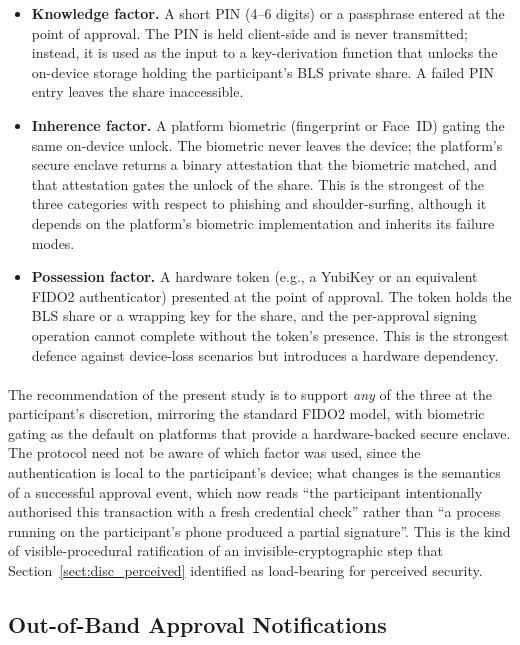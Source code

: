 \begin{itemize}
  \item \textbf{Knowledge factor.} A short PIN (4--6 digits) or a passphrase entered at the point of approval. The PIN is held client-side and is never transmitted; instead, it is used as the input to a key-derivation function that unlocks the on-device storage holding the participant's BLS private share. A failed PIN entry leaves the share inaccessible.
  \item \textbf{Inherence factor.} A platform biometric (fingerprint or Face~ID) gating the same on-device unlock. The biometric never leaves the device; the platform's secure enclave returns a binary attestation that the biometric matched, and that attestation gates the unlock of the share. This is the strongest of the three categories with respect to phishing and shoulder-surfing, although it depends on the platform's biometric implementation and inherits its failure modes.
  \item \textbf{Possession factor.} A hardware token (e.g., a YubiKey or an equivalent FIDO2 authenticator) presented at the point of approval. The token holds the BLS share or a wrapping key for the share, and the per-approval signing operation cannot complete without the token's presence. This is the strongest defence against device-loss scenarios but introduces a hardware dependency.
\end{itemize}

\paragraph{}The recommendation of the present study is to support \textit{any} of the three at the participant's discretion, mirroring the standard FIDO2 model, with biometric gating as the default on platforms that provide a hardware-backed secure enclave. The protocol need not be aware of which factor was used, since the authentication is local to the participant's device; what changes is the semantics of a successful approval event, which now reads ``the participant intentionally authorised this transaction with a fresh credential check'' rather than ``a process running on the participant's phone produced a partial signature''. This is the kind of visible-procedural ratification of an invisible-cryptographic step that Section~\ref{sect:disc_perceived} identified as load-bearing for perceived security.

\subsection{Out-of-Band Approval Notifications}
\label{sect:rec_notify}


